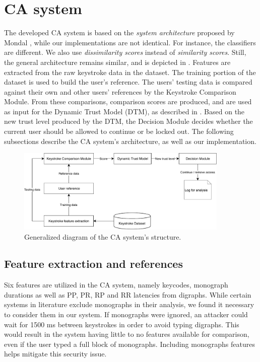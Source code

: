 \section{CA system}
\label{sec:system-design_CA-system}
The developed CA system is based on the \textit{system architecture} proposed by Mondal \cite{mondal}, while our implementations are not identical.
For instance, the classifiers are different. 
We also use \textit{dissimilarity scores} instead of \textit{similarity scores}.
Still, the general architecture remains similar, and is depicted in .
Features are extracted from the raw keystroke data in the dataset.
The training portion of the dataset is used to build the user's reference. 
The users' testing data is compared against their own and other users' references by the Keystroke Comparison Module.
From these comparisons, comparison scores are produced, and are used as input for the Dynamic Trust Model (DTM), as described in .
Based on the new trust level produced by the DTM, the Decision Module decides whether the current user should be allowed to continue or be locked out.
The following subsections describe the CA system's architecture, as well as our implementation.

\begin{figure}[h]
    \centering
    \includegraphics[width=0.9\textwidth]{figures/CA-diagram.pdf}
    \caption{Generalized diagram of the CA system's structure.}
    \label{fig:CA-diagram}
\end{figure}


\subsection{Feature extraction and references}
\label{sec:system-design-CA-ref}
Six features are utilized in the CA system, namely keycodes, monograph durations as well as PP, PR, RP and RR latencies from digraphs.
While certain systems in literature exclude monographs in their analysis, we found it necessary to consider them in our system.
If monographs were ignored, an attacker could wait for 1500 ms between keystrokes in order to avoid typing digraphs.
This would result in the system having little to no features available for comparison, even if the user typed a full block of monographs.
Including monographs features helps mitigate this security issue.

